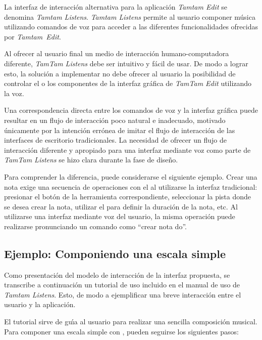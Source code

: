 La interfaz de interacci\'on alternativa para la aplicaci\'on \emph{Tamtam Edit} se denomina  
\emph{Tamtam Listens}. \emph{Tamtam Listens} permite al usuario componer m\'usica utilizando comandos
de voz para acceder a las diferentes funcionalidades ofrecidas por \mbox{\emph{Tamtam Edit}.}

Al ofrecer al usuario final un medio de interacci\'on humano-computadora diferente, \emph{TamTam Listens}
debe ser intuitivo y f\'acil de usar. De modo a lograr esto, la soluci\'on a implementar no debe 
ofrecer al usuario la posibilidad de controlar el  o los componentes de la interfaz 
gr\'afica de \emph{TamTam Edit} utilizando la voz. 

Una correspondencia directa entre los comandos de voz y la interfaz gr\'afica puede resultar en 
un flujo de interacci\'on poco natural e inadecuado, motivado \'unicamente por la intenci\'on err\'onea 
de imitar el flujo de interacci\'on de las interfaces de escritorio tradicionales. 
La necesidad de ofrecer un flujo de interacci\'on diferente y apropiado para una interfaz mediante voz
como parte de \emph{TamTam Listens} se hizo clara durante la fase de dise\~no.

Para comprender la diferencia, puede considerarse el siguiente ejemplo. 
Crear una nota exige una secuencia de operaciones con el  al utilizarse la
interfaz tradicional: presionar el bot\'on de la herramienta correspondiente, seleccionar la pista
donde se desea crear la nota, utilizar el  para definir la 
duraci\'on de la nota, etc. Al utilizarse una interfaz mediante voz del usuario, la misma operaci\'on
puede realizarse pronunciando un comando como ``crear nota do''.

\subsection{Ejemplo: Componiendo una escala simple}
\label{sec:ejemplo-escala}

Como presentaci\'on del modelo de interacci\'on de la interfaz propuesta, se transcribe a 
continuaci\'on un tutorial de uso incluido en el manual de uso de \emph{Tamtam Listens}. 
Esto, de modo a ejemplificar una breve interacci\'on entre el usuario y la aplicaci\'on.

El tutorial sirve de gu{\'\i}a al usuario para realizar una sencilla composici\'on musical.
Para componer una escala simple con , pueden seguirse los siguientes pasos:

